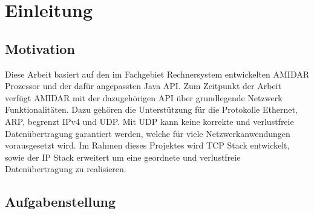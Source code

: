 \chapter{Einleitung}

\section{Motivation}

Diese Arbeit basiert auf den im Fachgebiet Rechnersystem entwickelten AMIDAR Prozessor und der dafür angepassten Java API. Zum Zeitpunkt der Arbeit verfügt AMIDAR mit der dazugehörigen API über grundlegende Netzwerk Funktionalitäten. Dazu gehören die Unterstützung für die Protokolle Ethernet, ARP, begrenzt IPv4 und UDP. Mit UDP kann keine korrekte und verlustfreie Datenübertragung garantiert werden, welche für viele Netzwerkanwendungen vorausgesetzt wird. Im Rahmen dieses Projektes wird TCP Stack entwickelt, sowie der IP Stack erweitert um eine geordnete und verlustfreie Datenübertragung zu realisieren. 


\section{Aufgabenstellung}

